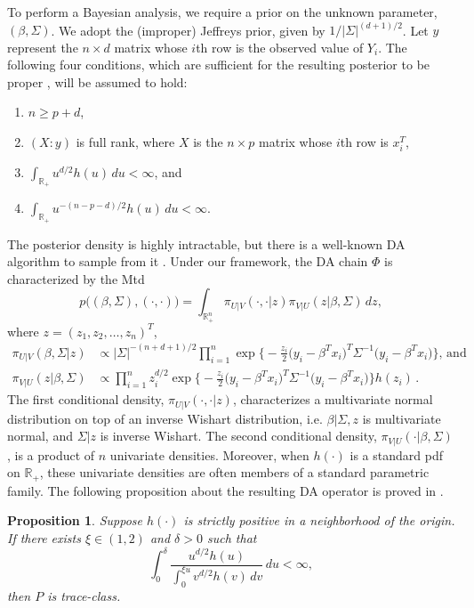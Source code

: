 \documentclass[11pt]{article}
\newtheorem{proposition}[theorem]{Proposition}
\begin{document}
	To perform a Bayesian analysis, we require a prior on the
	unknown parameter, $(\beta,\Sigma)$.  We adopt the (improper)
	Jeffreys prior, given by $1/|\Sigma|^{(d+1)/2}$.  Let $y$
	represent the $n \times d$ matrix whose $i$th row is the
	observed value of $Y_i$.  The following four conditions, which
	are sufficient for the resulting posterior to be proper
	\citep{qin2018trace, fernandez1999multivariate}, will be
	assumed to hold:
	\begin{enumerate}
		\item $n \geq p + d$,
		\item $(X:y)$ is full rank, where $X$ is the $n\times
		p$ matrix whose $i$th row is $x_i^T$,
		\item
		$
		\int_{\mathbb{R}_+} u^{d/2} h(u) \, du < \infty
		$, and
		\item
		$
		\int_{\mathbb{R}_+} u^{-(n-p-d)/2} h(u) \, du < \infty
		$.
	\end{enumerate}
	The posterior density is highly intractable, but there is a
	well-known DA algorithm to sample from it
	\citep{liu1996bayesian}. Under our framework, the DA chain
	$\Phi$ is characterized by the Mtd
	\[
	p\big((\beta,\Sigma),(\cdot,\cdot) \big) = \int_{\mathbb{R}_+^n} \pi_{U|V}(\cdot,\cdot| z) \pi_{V|U}(z|\beta,\Sigma) \, dz,
	\]
	where $z=(z_1,z_2,\dots,z_n)^T$,
	\[
	\begin{aligned}
	\pi_{U|V}(\beta,\Sigma|z) & \propto |\Sigma|^{-(n+d+1)/2} \prod_{i=1}^{n}\exp \Big\{ -\frac{z_i}{2} \big(y_i-\beta^Tx_i \big)^T \Sigma^{-1} \big(y_i-\beta^Tx_i \big) \Big\}, \, \mbox{and} \\
	\pi_{V|U}(z|\beta,\Sigma) & \propto \prod_{i=1}^{n}
	z_i^{d/2} \exp \Big\{ -\frac{z_i}{2} \big(y_i-\beta^Tx_i
	\big)^T \Sigma^{-1} \big(y_i-\beta^Tx_i \big) \Big\} h(z_i)
	\,.
	\end{aligned}
	\]
	The first conditional density, $\pi_{U|V}(\cdot,\cdot|z)$,
	characterizes a multivariate normal distribution on top of an
	inverse Wishart distribution, i.e. $\beta|\Sigma,z$ is
	multivariate normal, and $\Sigma|z$ is inverse Wishart.  The
	second conditional density, $\pi_{V|U}(\cdot|\beta,\Sigma)$,
	is a product of $n$ univariate densities.  Moreover, when
	$h(\cdot)$ is a standard pdf on $\mathbb{R}_+$, these
	univariate densities are often members of a standard
	parametric family.  The following proposition about the
	resulting DA operator is proved in \cite{qin2018trace}.
	\begin{proposition} \label{nongaussian} Suppose $h(\cdot)$ is
		strictly positive in a neighborhood of the origin. If there
		exists $\xi \in (1,2)$ and $\delta>0$ such that
		\[
		\int_{0}^{\delta} \frac{u^{d/2}h(u)}{\int_{0}^{\xi u} v^{d/2} h(v) \, dv} \, du < \infty, 
		\]
		then $P$ is trace-class.
	\end{proposition}
	
\end{document}
